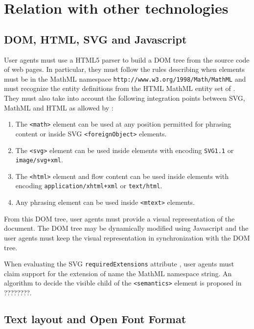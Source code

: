 \section{Relation with other technologies}

\subsection{DOM, HTML, SVG and Javascript}

User agents must use a HTML5 \cite{HTML5} parser to build a DOM tree
\cite{DOM1} from the source code of web pages. In particular, they must follow
the rules describing when elements must be in the MathML namespace
{\tt http://www.w3.org/1998/Math/MathML} and must
recognize the entity definitions from the HTML MathML entity set of
\cite{XMLEntities}. They must also take into account the following integration
points between SVG, MathML and HTML as allowed by \cite{ValidatorSchemas}:

\begin{enumerate}
\item The {\tt <math>} element can be used at any position permitted for
  phrasing content or inside SVG {\tt <foreignObject>} elements.
\item The {\tt <svg>} element can be used inside {\tt <annotation-xml>}
  elements with encoding {\tt SVG1.1} or {\tt image/svg+xml}.
\item The {\tt <html>} element and flow content can be used inside
  {\tt <annotation-xml>} elements with encoding {\tt application/xhtml+xml}
  or {\tt text/html}.
\item Any phrasing element can be used inside {\tt <mtext>} elements.
\end{enumerate}

From this DOM tree, user agents must provide a visual representation of the
document. The DOM tree may be dynamically modified using Javascript
\cite{ECMA262} and the user agents must keep the visual representation in
synchronization with the DOM tree.

When evaluating the SVG {\tt requiredExtensions} attribute \cite{SVG11},
user agents must claim support for the extension of name the MathML namespace
string.
An algorithm to decide the visible child of the {\tt <semantics>} element is
proposed in ????????.

\subsection{Text layout and Open Font Format}

